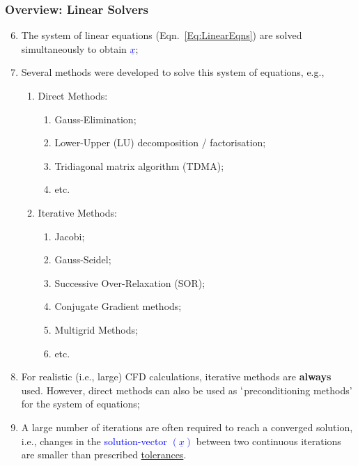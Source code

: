 \documentclass[10pt,compress,handout,ignorenonframetext]{beamer}
\begin{document}
\begin{frame}
 \frametitle{Overview: Linear Solvers} 
\begin{enumerate}
  \setcounter{enumi}{5}
  \item <1-> The system of linear equations (Eqn.~\ref{Eq:LinearEqns}) are solved simultaneously to obtain \textcolor{blue}{$\underline{x}$};
  \item <2-> Several methods were developed to solve this system of equations, e.g.,
    \begin{enumerate}
       \item<3-> Direct Methods: 
          \begin{enumerate}
             \item <5-> Gauss-Elimination;
             \item <6-> Lower-Upper (LU) decomposition / factorisation;
             \item <7-> Tridiagonal matrix algorithm (TDMA);
             \item <8-> etc. 
          \end{enumerate}
       \item<4-> Iterative Methods:
          \begin{enumerate}
             \item <9-> Jacobi;
             \item <10-> Gauss-Seidel;
             \item <11-> Successive Over-Relaxation (SOR);
             \item <12-> Conjugate Gradient methods;
             \item <13-> Multigrid Methods;
             \item <14-> etc.
          \end{enumerate}
    \end{enumerate}
  \item <15-> For realistic (i.e., large) CFD calculations, iterative methods are {\bf always} used. However, direct methods can also be used as $\lq$preconditioning methods' for the system of equations;
   \item <16-> A large number of iterations are often required to reach a converged solution, i.e., changes in the \textcolor{blue}{solution-vector $\left(\underline{x}\right)$} between two continuous iterations are smaller than prescribed \underline{tolerances}.
\end{enumerate}

\end{frame}
 
\end{document}
